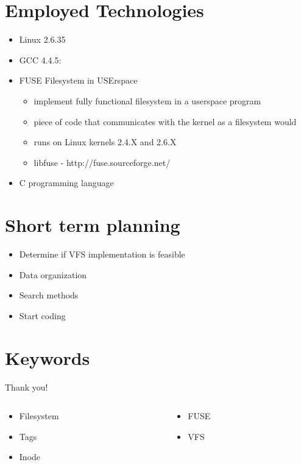 \documentclass{beamer}
\begin{document}
\section{Employed Technologies}

\begin{frame}
  \begin{itemize}
  \item Linux 2.6.35
  \item GCC 4.4.5:
  \item FUSE  Filesystem in USErspace
	\begin{itemize}
	\item implement fully functional filesystem in a userspace program 
	\item piece of code that communicates with the kernel as a filesystem would
	\item runs on Linux kernels 2.4.X and 2.6.X
    \item libfuse - http://fuse.sourceforge.net/
    \end{itemize}
  \item C programming language
  \end{itemize}
\end{frame}

\section{Short term planning}

\begin{frame}
  \begin{itemize}
    \item Determine if VFS implementation is feasible
    \item Data organization
    \item Search methods
    \item Start coding
  \end{itemize}
\end{frame}

\section{Keywords}
\begin{frame}{Thank you!} 
\begin{columns}
	\begin{column}[l]{0.5\textwidth}
	  \begin{itemize}
        \item Filesystem
        \item Tags
        \item Inode
	  \end{itemize}
	\end{column}
	\begin{column}[c]{0.5\textwidth}
	  \begin{itemize}
        \item FUSE 
        \item VFS
	  \end{itemize}    
	\end{column}
      \end{columns}

\end{frame}
\end{document}
